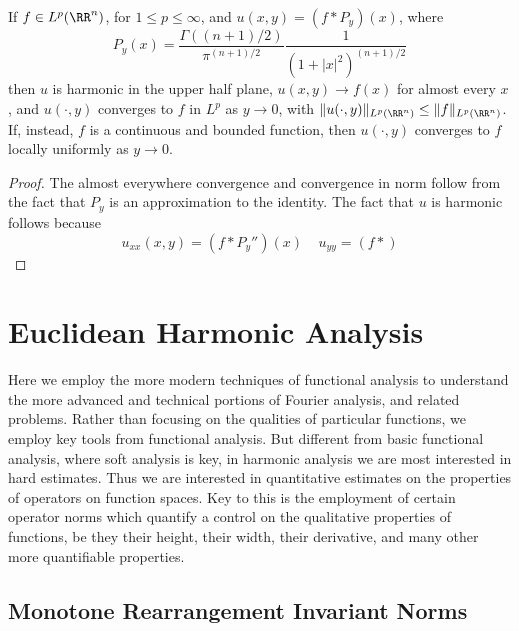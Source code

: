 \begin{theorem}
	If $f \in L^p(\RR^n)$, for $1 \leq p \leq \infty$, and $u(x,y) = (f * P_y)(x)$, where
	\[ P_y(x) = \frac{\Gamma((n+1)/2)}{\pi^{(n+1)/2}} \frac{1}{(1 + |x|^2)^{(n+1)/2}} \]
	then $u$ is harmonic in the upper half plane, $u(x,y) \to f(x)$ for almost every $x$, and $u(\cdot,y)$ converges to $f$ in $L^p$ as $y \to 0$, with $\| u(\cdot,y) \|_{L^p(\RR^n)} \leq \| f \|_{L^p(\RR^n)}$. If, instead, $f$ is a continuous and bounded function, then $u(\cdot,y)$ converges to $f$ locally uniformly as $y \to 0$.
\end{theorem}
\begin{proof}
	The almost everywhere convergence and convergence in norm follow from the fact that $P_y$ is an approximation to the identity. The fact that $u$ is harmonic follows because
	\[ u_{xx}(x,y) = (f * P_y'')(x)\ \ \ \ \ u_{yy} = (f * ) \]
\end{proof}


















\part{Euclidean Harmonic Analysis}

Here we employ the more modern techniques of functional analysis to understand the more advanced and technical portions of Fourier analysis, and related problems. Rather than focusing on the qualities of particular functions, we employ key tools from functional analysis. But different from basic functional analysis, where soft analysis is key, in harmonic analysis we are most interested in hard estimates. Thus we are interested in quantitative estimates on the properties of operators on function spaces. Key to this is the employment of certain operator norms which quantify a control on the qualitative properties of functions, be they their height, their width, their derivative, and many other more quantifiable properties.








\chapter{Monotone Rearrangement Invariant Norms}

